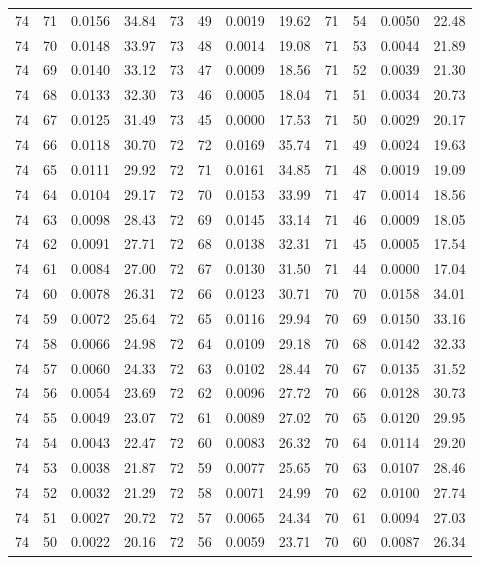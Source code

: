 \begin{tabular}{llll|llll|llll}
74 & 71 & 0.0156 & 34.84 & 73 & 49 & 0.0019 & 19.62 & 71 & 54 & 0.0050 & 22.48\\
74 & 70 & 0.0148 & 33.97 & 73 & 48 & 0.0014 & 19.08 & 71 & 53 & 0.0044 & 21.89\\
74 & 69 & 0.0140 & 33.12 & 73 & 47 & 0.0009 & 18.56 & 71 & 52 & 0.0039 & 21.30\\
74 & 68 & 0.0133 & 32.30 & 73 & 46 & 0.0005 & 18.04 & 71 & 51 & 0.0034 & 20.73\\
74 & 67 & 0.0125 & 31.49 & 73 & 45 & 0.0000 & 17.53 & 71 & 50 & 0.0029 & 20.17\\
74 & 66 & 0.0118 & 30.70 & 72 & 72 & 0.0169 & 35.74 & 71 & 49 & 0.0024 & 19.63\\
74 & 65 & 0.0111 & 29.92 & 72 & 71 & 0.0161 & 34.85 & 71 & 48 & 0.0019 & 19.09\\
74 & 64 & 0.0104 & 29.17 & 72 & 70 & 0.0153 & 33.99 & 71 & 47 & 0.0014 & 18.56\\
74 & 63 & 0.0098 & 28.43 & 72 & 69 & 0.0145 & 33.14 & 71 & 46 & 0.0009 & 18.05\\
74 & 62 & 0.0091 & 27.71 & 72 & 68 & 0.0138 & 32.31 & 71 & 45 & 0.0005 & 17.54\\
74 & 61 & 0.0084 & 27.00 & 72 & 67 & 0.0130 & 31.50 & 71 & 44 & 0.0000 & 17.04\\
74 & 60 & 0.0078 & 26.31 & 72 & 66 & 0.0123 & 30.71 & 70 & 70 & 0.0158 & 34.01\\
74 & 59 & 0.0072 & 25.64 & 72 & 65 & 0.0116 & 29.94 & 70 & 69 & 0.0150 & 33.16\\
74 & 58 & 0.0066 & 24.98 & 72 & 64 & 0.0109 & 29.18 & 70 & 68 & 0.0142 & 32.33\\
74 & 57 & 0.0060 & 24.33 & 72 & 63 & 0.0102 & 28.44 & 70 & 67 & 0.0135 & 31.52\\
74 & 56 & 0.0054 & 23.69 & 72 & 62 & 0.0096 & 27.72 & 70 & 66 & 0.0128 & 30.73\\
74 & 55 & 0.0049 & 23.07 & 72 & 61 & 0.0089 & 27.02 & 70 & 65 & 0.0120 & 29.95\\
74 & 54 & 0.0043 & 22.47 & 72 & 60 & 0.0083 & 26.32 & 70 & 64 & 0.0114 & 29.20\\
74 & 53 & 0.0038 & 21.87 & 72 & 59 & 0.0077 & 25.65 & 70 & 63 & 0.0107 & 28.46\\
74 & 52 & 0.0032 & 21.29 & 72 & 58 & 0.0071 & 24.99 & 70 & 62 & 0.0100 & 27.74\\
74 & 51 & 0.0027 & 20.72 & 72 & 57 & 0.0065 & 24.34 & 70 & 61 & 0.0094 & 27.03\\
74 & 50 & 0.0022 & 20.16 & 72 & 56 & 0.0059 & 23.71 & 70 & 60 & 0.0087 & 26.34\\

\end{tabular}
